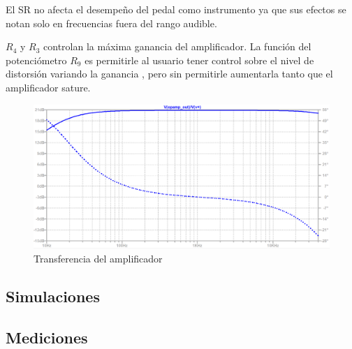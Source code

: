 \documentclass[../../main.tex]{subfiles}
\begin{document}
El SR no afecta el desempe\~no del pedal como instrumento ya que sus efectos se notan solo en frecuencias fuera del rango audible.


$R_4$ y $R_3$ controlan la m\'axima ganancia del amplificador. La funci\'on del potenci\'ometro $R_9$ es permitirle al usuario tener control sobre el nivel de distorsi\'on variando la ganancia , pero sin permitirle aumentarla tanto que el amplificador sature.

\begin{figure}
	\includegraphics[scale=.4]{imagenes/bode_opamp_simulacion_300mv.png}
	\caption{Transferencia del amplificador}
	\label{fig:ej5_transferencia_opamp}
\end{figure}


\subsection{Simulaciones}

\subsection{Mediciones}
\end{document}
